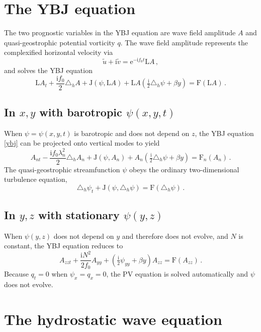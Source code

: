 \documentclass[12pt, oneside]{article}
\newcommand{\com}{\, ,}
\newcommand{\per}{\, .}
\newcommand{\beq}{\begin{equation}}
\newcommand{\eeq}{\end{equation}}
\newcommand{\hlap}{\triangle_h}
\newcommand{\ee}{\mathrm{e}}
\newcommand{\ii}{\mathrm{i}}
\newcommand{\J}{\mathrm{J}}
\renewcommand{\L}{\mathrm{L}}
\newcommand{\friction}{\mathrm{F}}
\begin{document}
\section{The YBJ equation}

The two prognostic variables in the YBJ equation are wave field amplitude $A$ and quasi-geostrophic potential vorticity $q$. The wave field amplitude represents the complexified horizontal velocity via
\beq
\tilde u + \ii \tilde v = \ee^{- \ii f_0 t} \L A \com
\eeq
and solves the YBJ equation
\beq
\L A_t + \frac{\ii f_0}{2} \hlap A +  \J \left ( \psi, \L A \right ) + \L A \left ( \tfrac{\ii}{2} \hlap \psi + \beta y \right ) = \friction \left ( \L A \right ) \per
\label{ybj}
\eeq

\subsection{In $x,y$ with barotropic $\psi(x, y, t)$}

When $\psi = \psi(x, y, t)$ is barotropic and does not depend on $z$, the YBJ equation \eqref{ybj} can be projected onto vertical modes to yield
\beq
A_{nt} - \frac{\ii f_0 \lambda_n^2}{2} \hlap A_n + \J \left ( \psi, A_n \right ) + A_n \left ( \tfrac{\ii}{2} \hlap \psi + \beta y \right ) = \friction_{n} \left ( A_n \right ) \per
\eeq
The quasi-geostrophic streamfunction $\psi$ obeys the ordinary two-dimensional turbulence equation, 
\beq
\hlap \psi_t + \J \left ( \psi, \hlap \psi \right ) = \friction \left ( \hlap \psi \right ) \per
\eeq

\subsection{In $y, z$ with stationary $\psi(y, z)$}

When $\psi(y, z)$ does not depend on $y$ and therefore does not evolve, and $N$ is constant, the YBJ equation reduces to
\beq
A_{zzt} + \frac{\ii N^2}{2 f_0} A_{yy} + \left ( \tfrac{\ii}{2} \psi_{yy} + \beta y \right ) A_{zz} = \friction \left ( A_{zz} \right ) \per
\eeq
Because $q_t = 0$ when $\psi_x = q_x = 0$, the PV equation is solved automatically and $\psi$ does not evolve.

\section{The hydrostatic wave equation}
\end{document}
